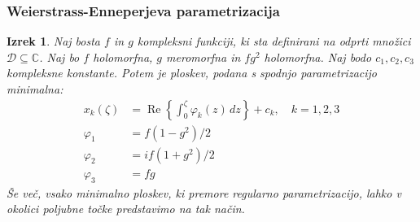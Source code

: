 \documentclass[10pt]{beamer}
\theoremstyle{definition}
\theoremstyle{remark}
\theoremstyle{plain}
\newtheorem{izrek}[definicija]{Izrek}
\numberwithin{equation}{section}  %
\begin{document}
\begin{frame}
    \frametitle{Weierstrass-Enneperjeva parametrizacija}

    \begin{izrek}
        Naj bosta $f$ in $g$ kompleksni funkciji, ki sta definirani na odprti množici $\mathcal{D}\subseteq\mathbb{C}$. Naj bo $f$ holomorfna, $g$ meromorfna in $f g^2$ holomorfna. Naj bodo $c_1, c_2, c_3$ kompleksne konstante. Potem je ploskev, podana s spodnjo parametrizacijo minimalna:
        $$
        \begin{aligned}
            x_k(\zeta) & =\operatorname{Re}\left\{\int_0^\zeta \varphi_k(z) \, dz\right\}+c_k, \quad k=1,2,3 \\
            \varphi_1 & =f\left(1-g^2\right) / 2 \\
            \varphi_2 & =i f\left(1+g^2\right) / 2 \\
            \varphi_3 & =f g
        \end{aligned}
        $$
        Še več, vsako minimalno ploskev, ki premore regularno parametrizacijo, lahko v okolici poljubne točke predstavimo na tak način.
    \end{izrek}
\end{frame}
\end{document}
